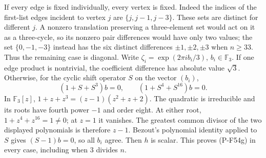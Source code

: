 If every edge is fixed individually, every vertex is fixed.
Indeed the indices of the first-list edges incident to vertex
$j$ are $\{j,j-1,j-3\}$. These sets are distinct for different
$j$. A nonzero translation preserving a three-element set
would act on it as a three-cycle, so its nonzero pair
differences would have only two values; the set
$\{0,-1,-3\}$ instead has the six distinct differences
$\pm1,\pm2,\pm3$ when $n\ge33$.
Thus the remaining case is diagonal. Write
$\zeta_i=\exp(2\pi i b_i/3)$, $b_i\in\mathbb F_3$.
If one edge product is nontrivial, the coefficient difference
has absolute value $\sqrt3$. Otherwise, for the cyclic shift
operator $S$ on the vector $(b_i)$,
\[
       (1+S+S^3)b=0,
       \qquad(1+S^4+S^{16})b=0.                              \tag{P-F54h}
\]
In $\mathbb F_3[z]$,
$1+z+z^3=(z-1)(z^2+z+2)$.
The quadratic is irreducible and its roots have fourth
power $-1$ and order eight. At either root,
$1+z^4+z^{16}=1\ne0$; at $z=1$ it vanishes.
The greatest common divisor of the two displayed polynomials
is therefore $z-1$. Bezout's polynomial identity applied to
$S$ gives $(S-1)b=0$, so all $b_i$ agree.
Then $h$ is scalar. This proves (P-F54g) in every case,
including when $3$ divides $n$.

